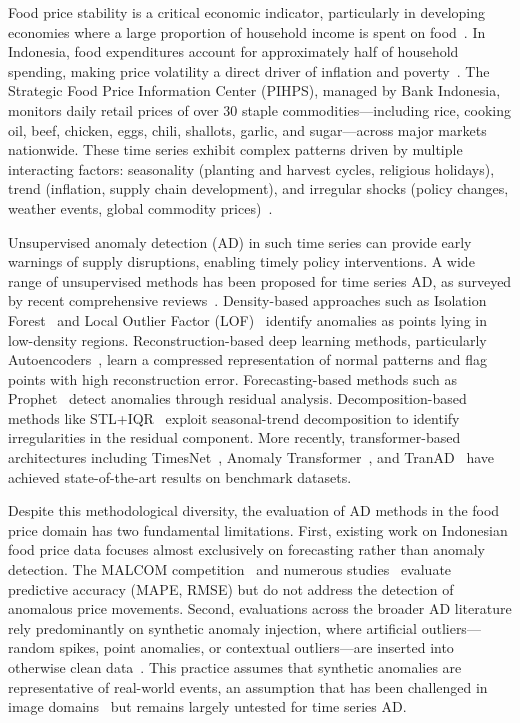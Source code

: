 \documentclass[10pt]{article}
\begin{document}
Food price stability is a critical economic indicator, particularly in developing economies where a large proportion of household income is spent on food~\cite{pihps_bi}. In Indonesia, food expenditures account for approximately half of household spending, making price volatility a direct driver of inflation and poverty~\cite{bueno2025food}. The Strategic Food Price Information Center (PIHPS), managed by Bank Indonesia, monitors daily retail prices of over 30 staple commodities---including rice, cooking oil, beef, chicken, eggs, chili, shallots, garlic, and sugar---across major markets nationwide. These time series exhibit complex patterns driven by multiple interacting factors: seasonality (planting and harvest cycles, religious holidays), trend (inflation, supply chain development), and irregular shocks (policy changes, weather events, global commodity prices)~\cite{bueno2025food}.

Unsupervised anomaly detection (AD) in such time series can provide early warnings of supply disruptions, enabling timely policy interventions. A wide range of unsupervised methods has been proposed for time series AD, as surveyed by recent comprehensive reviews~\cite{darban2022survey,jin2023graph,wang2024survey}. Density-based approaches such as Isolation Forest~\cite{liu2008isolation} and Local Outlier Factor (LOF)~\cite{breunig2000lof} identify anomalies as points lying in low-density regions. Reconstruction-based deep learning methods, particularly Autoencoders~\cite{darban2022survey}, learn a compressed representation of normal patterns and flag points with high reconstruction error. Forecasting-based methods such as Prophet~\cite{taylor2018prophet} detect anomalies through residual analysis. Decomposition-based methods like STL+IQR~\cite{cleveland1990stl} exploit seasonal-trend decomposition to identify irregularities in the residual component. More recently, transformer-based architectures including TimesNet~\cite{wu2023timesnet}, Anomaly Transformer~\cite{xu2022anomaly}, and TranAD~\cite{tuli2022tranad} have achieved state-of-the-art results on benchmark datasets.

Despite this methodological diversity, the evaluation of AD methods in the food price domain has two fundamental limitations. First, existing work on Indonesian food price data focuses almost exclusively on forecasting rather than anomaly detection. The MALCOM competition~\cite{malcom2026} and numerous studies~\cite{makridakis2022m5} evaluate predictive accuracy (MAPE, RMSE) but do not address the detection of anomalous price movements. Second, evaluations across the broader AD literature rely predominantly on synthetic anomaly injection, where artificial outliers---random spikes, point anomalies, or contextual outliers---are inserted into otherwise clean data~\cite{wu2023timesnet}. This practice assumes that synthetic anomalies are representative of real-world events, an assumption that has been challenged in image domains~\cite{swsa2023} but remains largely untested for time series AD.
\end{document}
